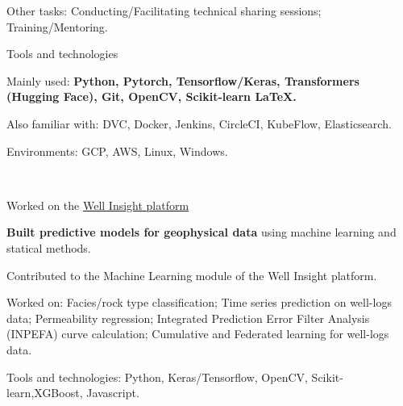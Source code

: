 \begin{xitemize}
\begin{zitemize}
    \end{zitemize}
    \item Other tasks: Conducting/Facilitating technical sharing sessions; Training/Mentoring.
    \item Tools and technologies
    \begin{zitemize}
        \item Mainly used: \textbf{Python, Pytorch, Tensorflow/Keras, Transformers (Hugging Face), Git, OpenCV, Scikit-learn \LaTeX.}
        \item Also familiar with: DVC, Docker, Jenkins, CircleCI, KubeFlow, Elasticsearch.
        \item Environments: GCP, AWS, Linux, Windows.
    \end{zitemize}
\end{xitemize}

\\
\vspace{-.2em}
\begin{xitemize}
    \item Worked on the \href{https://www.i2g.cloud/well-insight}{Well Insight platform \faUpRightFromSquare}
    \begin{zitemize}
        \item \textbf{Built predictive models for geophysical data} using machine learning and statical methods.
        \item Contributed to the Machine Learning module of the Well Insight platform.
        \item Worked on: Facies/rock type classification; Time series prediction on well-logs data; Permeability regression; Integrated Prediction Error Filter Analysis (INPEFA) curve calculation; Cumulative and Federated learning for well-logs data.
    \end{zitemize}
    \item Tools and technologies: Python, Keras/Tensorflow, OpenCV, Scikit-learn,XGBoost, Javascript.
\end{xitemize}

